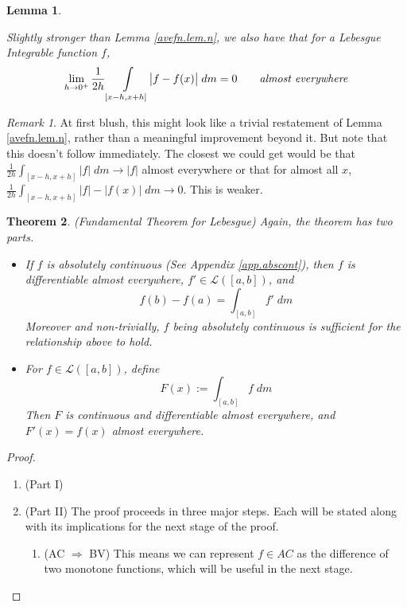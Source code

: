 \documentclass[12pt]{article}
\theoremstyle{plain}
\newtheorem{thm}{Theorem}[subsection]
\newtheorem{lem}[thm]{Lemma}
\theoremstyle{definition}
\theoremstyle{remark}
\newtheorem*{rmk}{Remark}
\begin{document}
\begin{lem}
\hypertarget{strongae.lem}{}
\label{strongae.lem.n}
Slightly stronger than Lemma \hyperlink{avefn.lem}{\ref*{avefn.lem.n}}, we also have that for a Lebesgue Integrable function $f$, 
\[
    \lim_{h\rightarrow0^+} \frac{1}{2h} \int\limits_{[x-h,x+h]} \bigl\lvert f-f(x)\bigr\rvert\; dm
    = 0
    \qquad \text{\emph{almost everywhere}}
\]
\end{lem}
\begin{rmk}
At first blush, this might look like a trivial restatement of Lemma \hyperlink{avefn.lem}{\ref*{avefn.lem.n}}, rather than a meaningful improvement beyond it. But note that this doesn't follow immediately. The closest we could get would be that $\frac{1}{2h}\int_{[x-h,x+h]} |f|\; dm  \rightarrow|f|$ almost everywhere or that for almost all $x$, $\frac{1}{2h}\int_{[x-h,x+h]} |f|-|f(x)|\; dm \rightarrow 0$. This is weaker.
\end{rmk}

\begin{thm}\emph{(Fundamental Theorem for Lebesgue)} Again, the theorem has two parts.
\begin{itemize} 
\item[\emph{I.}] If $f$ is absolutely continuous (See Appendix \ref{app.abscont}), then $f$ is differentiable almost everywhere, $f'\in\mathscr{L}([a,b])$, and 
\[
    f(b)-f(a) = \int_{[a,b]} f' \;dm
\]
Moreover and non-trivially, $f$ being absolutely continuous is \emph{sufficient} for the relationship above to hold.

\item[\emph{II.}] For $f\in\mathscr{L}([a,b])$, define 
\[
    F(x):=\int_{[a,b]} f\;dm
\]
Then $F$ is continuous and differentiable almost everywhere, and $F'(x)=f(x)$ almost everywhere. 
\end{itemize}
\end{thm}
\begin{proof}

\begin{enumerate} 
\item (Part I)
\item (Part II) The proof proceeds in three major steps. Each will be stated along with its implications for the next stage of the proof.
\begin{enumerate}
\item (AC $\Rightarrow$ BV) This means we can represent $f\in AC$ as the difference of two monotone functions, which will be useful in the next stage.
\end{enumerate}
\end{enumerate}
\end{proof}
\end{document}
